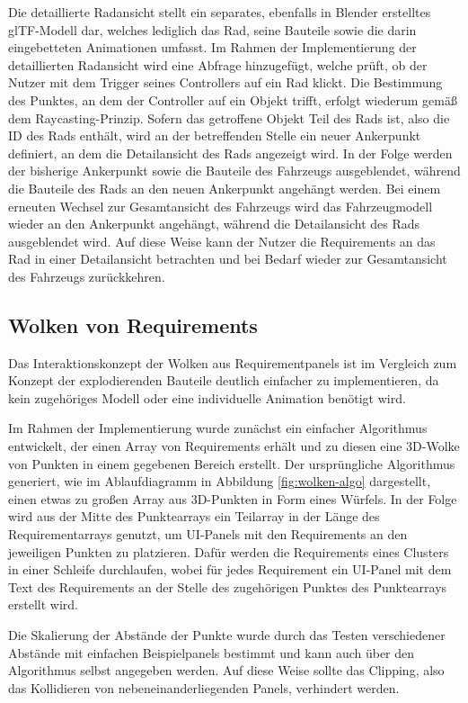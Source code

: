 Die detaillierte Radansicht stellt ein separates, ebenfalls in Blender erstelltes glTF-Modell dar, welches lediglich das Rad, seine Bauteile sowie die darin eingebetteten Animationen umfasst.
Im Rahmen der Implementierung der detaillierten Radansicht wird eine Abfrage hinzugefügt, welche prüft, ob der Nutzer mit dem Trigger seines Controllers auf ein Rad klickt.
Die Bestimmung des Punktes, an dem der Controller auf ein Objekt trifft, erfolgt wiederum gemäß dem Raycasting-Prinzip.
Sofern das getroffene Objekt Teil des Rads ist, also die ID des Rads enthält, wird an der betreffenden Stelle ein neuer Ankerpunkt definiert, an dem die Detailansicht des Rads angezeigt wird.
In der Folge werden der bisherige Ankerpunkt sowie die Bauteile des Fahrzeugs ausgeblendet, während die Bauteile des Rads an den neuen Ankerpunkt angehängt werden.
Bei einem erneuten Wechsel zur Gesamtansicht des Fahrzeugs wird das Fahrzeugmodell wieder an den Ankerpunkt angehängt, während die Detailansicht des Rads ausgeblendet wird.
Auf diese Weise kann der Nutzer die Requirements an das Rad in einer Detailansicht betrachten und bei Bedarf wieder zur Gesamtansicht des Fahrzeugs zurückkehren.

\subsection{Wolken von Requirements}

Das Interaktionskonzept der Wolken aus Requirementpanels ist im Vergleich zum Konzept der explodierenden Bauteile deutlich einfacher zu implementieren, da kein zugehöriges Modell oder eine individuelle Animation benötigt wird.

Im Rahmen der Implementierung wurde zunächst ein einfacher Algorithmus entwickelt, der einen Array von Requirements erhält und zu diesen eine 3D-Wolke von Punkten in einem gegebenen Bereich erstellt.
Der ursprüngliche Algorithmus generiert, wie im Ablaufdiagramm in Abbildung \ref{fig:wolken-algo} dargestellt, einen etwas zu großen Array aus 3D-Punkten in Form eines Würfels.
In der Folge wird aus der Mitte des Punktearrays ein Teilarray in der Länge des Requirementarrays genutzt, um UI-Panels mit den Requirements an den jeweiligen Punkten zu platzieren.
Dafür werden die Requirements eines Clusters in einer Schleife durchlaufen, wobei für jedes Requirement ein UI-Panel mit dem Text des Requirements an der Stelle des zugehörigen Punktes des Punktearrays erstellt wird.

Die Skalierung der Abstände der Punkte wurde durch das Testen verschiedener Abstände mit einfachen Beispielpanels bestimmt und kann auch über den Algorithmus selbst angegeben werden.
Auf diese Weise sollte das Clipping, also das Kollidieren von nebeneinanderliegenden Panels, verhindert werden.

